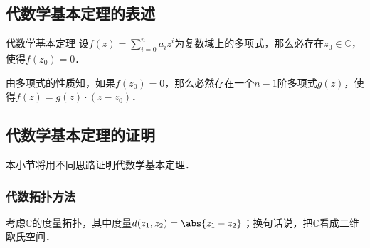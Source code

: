 

\subsection{代数学基本定理的表述}

\begin{definition}{代数学基本定理}
设$f(z)=\sum\limits_{i=0}^n a_iz^i$为复数域上的多项式，那么必存在$z_0\in\mathbb{C}$，使得$f(z_0)=0$．
\end{definition}

由多项式的性质知，如果$f(z_0)=0$，那么必然存在一个$n-1$阶多项式$g(z)$，使得$f(z)=g(z)\cdot(z-z_0)$．

\subsection{代数学基本定理的证明}

本小节将用不同思路证明代数学基本定理．

\subsubsection{代数拓扑方法}

考虑$\mathbb{C}$的度量拓扑，其中度量$d(z_1, z_2)=\abs{z_1-z_2}$；换句话说，把$\mathbb{C}$看成二维欧氏空间．


